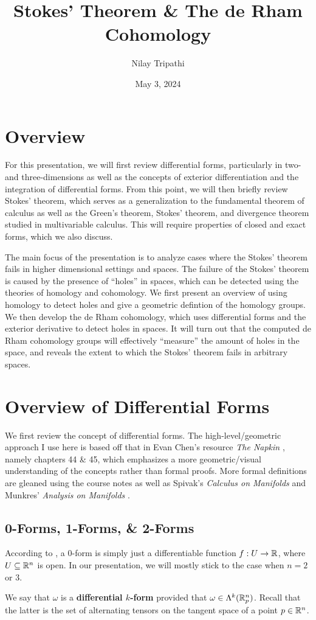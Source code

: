 \documentclass{article}
\title{Stokes' Theorem \& The de Rham Cohomology}
\author{Nilay Tripathi}
\date{May 3, 2024}
\begin{document}
		\maketitle

		\tableofcontents
		
		\section{Overview}
		For this presentation, we will first review differential forms, particularly in two- and three-dimensions as well as the concepts of exterior differentiation and the integration of differential forms. From this point, we will then briefly review Stokes' theorem, which serves as a generalization to the fundamental theorem of calculus as well as the Green's theorem, Stokes' theorem, and divergence theorem studied in multivariable calculus. This will require properties of closed and exact forms, which we also discuss. \par 

		The main focus of the presentation is to analyze cases where the Stokes' theorem fails in higher dimensional settings and spaces. The failure of the Stokes' theorem is caused by the presence of ``holes'' in spaces, which can be detected using the theories of homology and cohomology. We first present an overview of using homology to detect holes and give a geometric defintion of the homology groups. We then develop the de Rham cohomology, which uses differential forms and the exterior derivative to detect holes in spaces. It will turn out that the computed de Rham cohomology groups will effectively ``measure'' the amount of holes in the space, and reveals the extent to which the Stokes' theorem fails in arbitrary spaces. 

		\section{Overview of Differential Forms}
		We first review the concept of differential forms. The high-level/geometric approach I use here is based off that in Evan Chen's resource \emph{The Napkin} \cite{napkin}, namely chapters 44 \& 45, which emphasizes a more geometric/visual understanding of the concepts rather than formal proofs. More formal definitions are gleaned using the course notes as well as Spivak's \emph{Calculus on Manifolds} \cite{spivak} and Munkres' \emph{Analysis on Manifolds} \cite{munkres}.

		\subsection{0-Forms, 1-Forms, \& 2-Forms} 
		According to \cite{spivak}, a 0-form is simply just a differentiable function $f: U \to \mathbb{R}$, where $U \subseteq \mathbb{R}^n$ is open. In our presentation, we will mostly stick to the case when $n = 2$ or $3$. 
		\begin{defn}
				We say that $\omega$ is a \textbf{differential $k$-form} provided that $\omega \in \Lambda^k (\mathbb{R}^n_p)$. Recall that the latter is the set of alternating tensors on the tangent space of a point $p\in\mathbb{R}^n$. 
		\end{defn}
\end{document}
